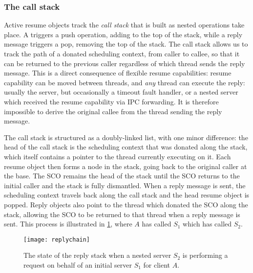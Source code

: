 \subsubsection{The call stack}

Active resume objects track the \emph{call stack} that is built as nested \call operations take
place. A \call triggers a push operation, adding to the top of the stack, while a reply message
triggers a
pop, removing the top of the stack.  The call stack allows us to track the path of a donated
scheduling context, from caller to callee, so that it can be returned to the previous caller
regardless of which thread sends the reply message. This is a direct consequence of flexible resume
capabilities: resume capability can be moved between threads, and \emph{any} thread can execute the
reply: usually the server, but occasionally a timeout fault handler, or a nested server which
received the resume capability via \gls{IPC} forwarding. It is therefore impossible to derive the
original callee from the thread sending the reply message.

The call stack is structured as a doubly-linked list, with one minor difference: the head of the
call stack is the scheduling context that was donated along the stack, which itself contains a
pointer to the thread currently executing on it. Each resume object then forms a node in the
stack, going back to the original caller at the base. The \gls{SCO} remains the head of the stack
until the \gls{SCO} returns to the initial caller and the stack is fully dismantled.  When a reply
message is sent, the scheduling context travels back along the call stack and the head resume object
is popped.  Reply objects also point to the thread which donated the \gls{SCO} along the stack,
allowing the SCO to be returned to that thread when a reply message is sent.  This process is
illustrated in \cref{f:reply-stack}, where $A$ has called $S_{1}$ which has called  $S_{2}$.

\begin{figure}[t]
    \centering
    \texttt{[image: replychain]}
    \caption{The state of the reply stack when a nested server $S_{2}$ is
performing a request on behalf of an initial server $S_{1}$ for client $A$.}
    \label{f:reply-stack}
\end{figure}

